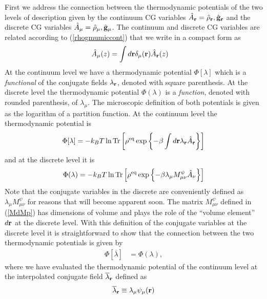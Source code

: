 \documentclass[b5paper,openright,10pt]{book}
\begin{document}
\begin{appendices}
First we  address the connection between  the thermodynamic potentials
of the two  levels of description given by the  continuum CG variables
$\hat{A}_{\bf  r}=\hat{\rho}_{\bf  r},\hat{\bf  g}_{\bf  r}$  and  the
discrete  CG  variables $\hat{A}_\mu=\hat{\rho}_\mu,\hat{\bf  g}_\mu$.
The  continuum and  discrete  CG variables  are  related according  to
(\ref{rhogmumiccont}) that we write in a compact form as
\begin{align}
  \hat{A}_\mu(z)&=\int d{\bf r}\delta_\mu({\bf r})\hat{A}_{\bf r}(z)
\end{align}
At   the   continuum  level   we   have   a  thermodynamic   potential
$\Phi[\lambda]$ which is a \textit{functional} of the conjugate fields
$\lambda_{\bf r}$,  denoted with square parenthesis.   At the discrete
level    the   thermodynamic    potential    $\Phi(\lambda)$   is    a
\textit{function}, denoted with rounded parenthesis, of $\lambda_\mu$.
The  microscopic  definition  of  both  potentials  is  given  as  the
logarithm  of  a  partition  function.  At  the  continuum  level  the
thermodynamic potential is
\begin{align}
  \Phi[\lambda]=-k_BT\ln{\rm Tr}\left[\rho^{\rm eq}\exp\left\{-\beta\int d{\bf r}\lambda_{\bf r}\hat{A}_{\bf r}\right\}\right]
 \end{align}
and at the discrete level it is 
  \begin{align}
  \Phi(\lambda)=-k_BT\ln{\rm Tr}\left[\rho^{\rm eq}\exp\left\{-\beta\lambda_{\mu}M^\psi_{\mu\nu}\hat{A}_{\nu}\right\}\right]
\end{align}
Note that  the conjugate  variables in  the discrete  are conveniently
defined as $\lambda_{\mu}M^\psi_{\mu\nu}$ for reasons that will become
apparent soon.   The matrix $M^\psi_{\mu\nu}$ defined  in (\ref{MdMp})
has dimensions of volume and plays  the role of the ``volume element''
$d{\bf  r}$  at the  discrete  level.   With  this definition  of  the
conjugate variables  at the  discrete level  it is  straightforward to
show that the  connection between the two  thermodynamic potentials is
given by
\begin{align}
  \Phi[\overline{\lambda}]&=  \Phi(\lambda),
\label{Phiphi}
\end{align}
where we have  evaluated the thermodynamic potential  of the continuum
level at the interpolated conjugate field $\overline{\lambda}_{\bf r}$
defined as
\begin{align}
  \overline{\lambda}_{\bf r}\equiv\lambda_\mu\psi_\mu({\bf r})
\end{align}

\end{appendices}
\end{document}
